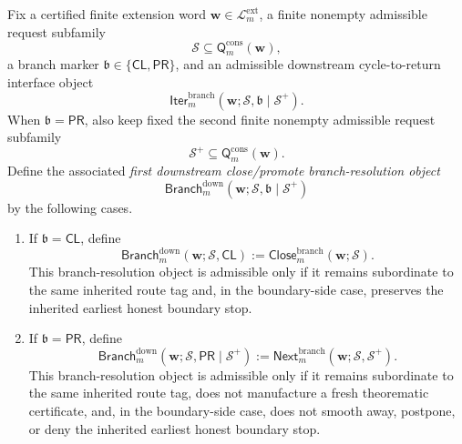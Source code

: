 \begin{definition}
\label{def:first-downstream-close-promote-branch-resolution-object}
Fix a certified finite extension word \(\mathbf w\in\mathcal L^{\mathrm{ext}}_{m}\), a finite nonempty admissible request subfamily
\[
 \mathcal S \subseteq \mathsf{Q}^{\mathrm{cons}}_{m}(\mathbf w),
\]
a branch marker \(\mathfrak b\in\{\mathsf{CL},\mathsf{PR}\}\), and an admissible downstream cycle-to-return interface object
{\small
\[
 \mathsf{Iter}^{\mathrm{branch}}_{m}(\mathbf w;\mathcal S,\mathfrak b\mid\mathcal S^{+}).
\]
}
When \(\mathfrak b=\mathsf{PR}\), also keep fixed the second finite nonempty admissible request subfamily
\[
 \mathcal S^{+}\subseteq \mathsf{Q}^{\mathrm{cons}}_{m}(\mathbf w).
\]
Define the associated \emph{first downstream close/promote branch-resolution object}
\[
 \mathsf{Branch}^{\mathrm{down}}_{m}(\mathbf w;\mathcal S,\mathfrak b\mid\mathcal S^{+})
\]
by the following cases.
\begin{enumerate}[label=(\roman*)]
 \item If \(\mathfrak b=\mathsf{CL}\), define
\[
 \mathsf{Branch}^{\mathrm{down}}_{m}(\mathbf w;\mathcal S,\mathsf{CL})
 :=
 \mathsf{Close}^{\mathrm{branch}}_{m}(\mathbf w;\mathcal S).
\]
This branch-resolution object is admissible only if it remains subordinate to the same inherited route tag and, in the boundary-side case, preserves the inherited earliest honest boundary stop.

 \item If \(\mathfrak b=\mathsf{PR}\), define
\[
 \mathsf{Branch}^{\mathrm{down}}_{m}(\mathbf w;\mathcal S,\mathsf{PR}\mid\mathcal S^{+})
 :=
 \mathsf{Next}^{\mathrm{branch}}_{m}(\mathbf w;\mathcal S,\mathcal S^{+}).
\]
This branch-resolution object is admissible only if it remains subordinate to the same inherited route tag, does not manufacture a fresh theorematic certificate, and, in the boundary-side case, does not smooth away, postpone, or deny the inherited earliest honest boundary stop.
\end{enumerate}
\end{definition}

